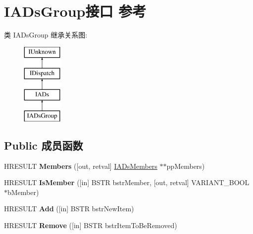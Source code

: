 \hypertarget{interface_i_a_ds_group}{}\section{I\+A\+Ds\+Group接口 参考}
\label{interface_i_a_ds_group}
类 I\+A\+Ds\+Group 继承关系图\+:\begin{figure}[H]
\begin{center}
\leavevmode
\includegraphics[height=4.000000cm]{interface_i_a_ds_group}
\end{center}
\end{figure}
\subsection*{Public 成员函数}
\begin{DoxyCompactItemize}
\item 
\mbox{\label{interface_i_a_ds_group_a83335fb9456fdf35f7fbd04e1f107baa}} 
H\+R\+E\+S\+U\+LT {\bfseries Members} (\mbox{[}out, retval\mbox{]} \hyperlink{interface_i_a_ds_members}{I\+A\+Ds\+Members} $\ast$$\ast$pp\+Members)
\item 
\mbox{\label{interface_i_a_ds_group_af6e3514b474771913ee651eb3f1ca9d3}} 
H\+R\+E\+S\+U\+LT {\bfseries Is\+Member} (\mbox{[}in\mbox{]} B\+S\+TR bstr\+Member, \mbox{[}out, retval\mbox{]} V\+A\+R\+I\+A\+N\+T\+\_\+\+B\+O\+OL $\ast$b\+Member)
\item 
\mbox{\label{interface_i_a_ds_group_a449663a302d8964fd1c2bab4f294040f}} 
H\+R\+E\+S\+U\+LT {\bfseries Add} (\mbox{[}in\mbox{]} B\+S\+TR bstr\+New\+Item)
\item 
\mbox{\label{interface_i_a_ds_group_a1504cba51967eda902008ba7605115b8}} 
H\+R\+E\+S\+U\+LT {\bfseries Remove} (\mbox{[}in\mbox{]} B\+S\+TR bstr\+Item\+To\+Be\+Removed)
\end{DoxyCompactItemize}
